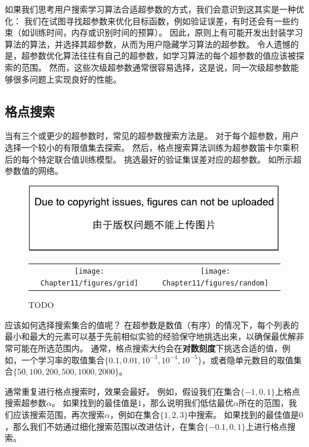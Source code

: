 如果我们思考用户搜索学习算法合适超参数的方式，我们会意识到这其实是一种优化：
我们在试图寻找超参数来优化目标函数，例如验证误差，有时还会有一些约束（如训练时间，内存或识别时间的预算）。
因此，原则上有可能开发出封装学习算法的算法，并选择其超参数，从而为用户隐藏学习算法的超参数。
令人遗憾的是，超参数优化算法往往有自己的超参数，如学习算法的每个超参数的值应该被探索的范围。
然而，这些次级超参数通常很容易选择，这是说，同一次级超参数能够很多问题上实现良好的性能。

\subsection{格点搜索}
\label{sec:grid_search}
当有三个或更少的超参数时，常见的超参数搜索方法是。
对于每个超参数，用户选择一个较小的有限值集去探索。
然后，格点搜索算法训练为超参数笛卡尔乘积后的每个特定联合值训练模型。
挑选最好的验证集误差对应的超参数。
如所示超参数值的网络。


\begin{figure}[!htb]
\ifOpenSource
\centerline{\includegraphics{figure.pdf}}
\else
\begin{tabular}{cc}
\texttt{[image: Chapter11/figures/grid]} &
\texttt{[image: Chapter11/figures/random]}
\end{tabular}
\fi
\caption{TODO}
\label{fig:chap11_grid_vs_random}
\end{figure}

应该如何选择搜索集合的值呢？
在超参数是数值（有序）的情况下，每个列表的最小和最大的元素可以基于先前相似实验的经验保守地挑选出来，以确保最优解非常可能在所选范围内。
通常，格点搜索大约会在\textbf{对数刻度}下挑选合适的值，例如，一个学习率的取值集合$\{0.1,0.01,10^{-3},10^{-4},10^{-5}\}$，或者隐单元数目的取值集合$\{50,100,200,500,1000,2000\}$。

通常重复进行格点搜索时，效果会最好。
例如，假设我们在集合$\{-1,0,1\}$上格点搜索超参数$\alpha$。
如果找到的最佳值是$1$，那么说明我们低估最优$\alpha$所在的范围，我们应该搜索范围，再次搜索$\alpha$，例如在集合$\{1,2,3\}$中搜索。
如果找到的最佳值是$0$，那么我们不妨通过细化搜索范围以改进估计，在集合$\{-0.1,0,1\}$上进行格点搜索。

